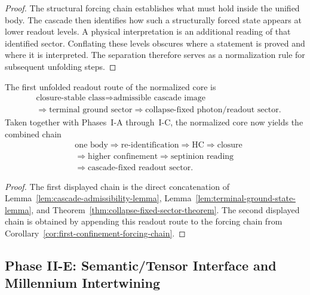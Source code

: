 \begin{proof}
The structural forcing chain establishes what must hold inside the unified
body. The cascade then identifies how such a structurally forced state appears
at lower readout levels. A physical interpretation is an additional reading of
that identified sector. Conflating these levels obscures where a statement is
proved and where it is interpreted. The separation therefore serves as a
normalization rule for subsequent unfolding steps.
\end{proof}

\begin{corollary}
\label{cor:first-readout-forcing-chain}
The first unfolded readout route of the normalized core is
\[
\begin{aligned}
&\text{closure-stable class} \Longrightarrow \text{admissible cascade image}\\
&\Longrightarrow \text{terminal ground sector} \Longrightarrow \text{collapse-fixed photon/readout sector}.
\end{aligned}
\]
Taken together with Phases~I-A through~I-C, the normalized core now yields the
combined chain
\[
\begin{aligned}
&\text{one body} \Longrightarrow \text{re-identification} \Longrightarrow \mathrm{HC} \Longrightarrow \text{closure}\\
&\Longrightarrow \text{higher confinement} \Longrightarrow \text{septinion reading}\\
&\Longrightarrow \text{cascade-fixed readout sector}.
\end{aligned}
\]
\end{corollary}

\begin{proof}
The first displayed chain is the direct concatenation of
Lemma~\ref{lem:cascade-admissibility-lemma},
Lemma~\ref{lem:terminal-ground-state-lemma}, and
Theorem~\ref{thm:collapse-fixed-sector-theorem}. The second displayed chain is
obtained by appending this readout route to the forcing chain from
Corollary~\ref{cor:first-confinement-forcing-chain}.
\end{proof}


\subsection*{Phase II-E: Semantic/Tensor Interface and Millennium Intertwining}

